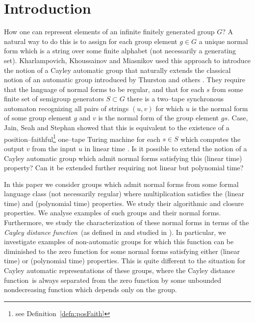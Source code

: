 \documentclass[article,12pt]{elsarticle}
\newcommand\distfun{Cayley distance function}
\begin{document}
\section{Introduction}

How one can represent elements of an infinite 
finitely generated group $G$? 
A natural way to do this is to assign for each 
group element $g \in G$ a unique normal form 
which is a string over some finite alphabet 
(not necessarily a generating set).
Kharlampovich, Khoussainov and Miasnikov 
used this approach to introduce the notion 
of a Cayley automatic group \cite{KKM11} 
that naturally extends     
the classical notion of an automatic group 
introduced by Thurston and others \cite{Epsteinbook}. 
They require that the language of normal forms 
to be regular, and that for each $s$ from
some finite set of semigroup generators 
$S \subset G$ there is a 
two--tape synchronous automaton     
recognizing all pairs of strings $(u,v)$  
for which $u$ is the normal form of some 
group element $g$ and $v$ is the normal form 
of the group element $gs$.  
Case, Jain, Seah and Stephan showed that
this   is  equivalent to the existence 
of a {position--faithful}\footnote{see Definition~\ref{defn:posFaith}}
one--tape Turing machine for each $s \in S$ 
which computes the output $v$ from the 
input $u$ in linear time \cite{Stephan_lmcs_13}.  
Is it possible to 
extend the notion of a Cayley automatic 
group which admit normal forms satisfying this (linear time) property?
Can it be extended further requiring not linear but polynomial time?    




In this paper we consider groups which 
admit normal forms from some formal language class (not necessarily regular) where multiplication  satisfies the (linear time)  
and (polynomial time) properties. 
We study their algorithmic
and closure properties.  
We analyse examples of such groups and 
their normal forms. 
Furthermore, we study the characterization of these normal 
forms in terms of the \emph{\distfun}\ 
 (as defined in \cite{BT_LATA18} and studied in \cite{eastwest19,BET19}).  
In particular, we investigate examples 
of non-automatic groups for which this  function can be 
diminished to the zero function for some normal forms 
satisfying either (linear time) or (polynomial time) 
properties. This is quite different to the situation for
Cayley automatic representations of these groups, where 
the \distfun\  
is always separated from the 
zero function by some unbounded 
nondecreasing function which depends only on the  group.   
\end{document}
